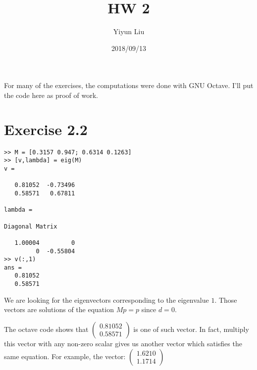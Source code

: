 \documentclass{article}
\title{HW 2}
\date{2018/09/13}
\author{Yiyun Liu}
\begin{document}
\maketitle
\lstset{basicstyle=\ttfamily}
For many of the exercises, the computations were done with GNU
Octave. I'll put the code here as proof of work.
\section*{Exercise 2.2}
\begin{lstlisting}
>> M = [0.3157 0.947; 0.6314 0.1263]
>> [v,lambda] = eig(M)
v =

   0.81052  -0.73496
   0.58571   0.67811

lambda =

Diagonal Matrix

   1.00004         0
         0  -0.55804
>> v(:,1)
ans =
   0.81052
   0.58571
\end{lstlisting}

We are looking for the eigenvectors corresponding to the eigenvalue
$1$. Those vectors are solutions of the equation $Mp=p$ since $d=0$.

The octave code shows that $
\begin{pmatrix}
  0.81052\\
  0.58571
\end{pmatrix}
$ is one of such vector. In fact, multiply this vector with any
non-zero scalar gives us another vector which satisfies the same
equation. For example, the vector: $
\begin{pmatrix}
  1.6210\\
  1.1714
\end{pmatrix}
$
\end{document}
